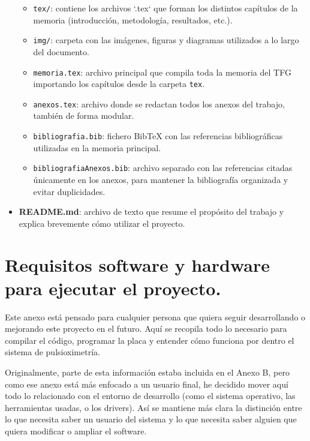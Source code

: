 \begin{itemize}
    \begin{itemize}
        \item \texttt{tex/}: contiene los archivos `.tex` que forman los distintos capítulos de la memoria (introducción, metodología, resultados, etc.). 
        \item \texttt{img/}: carpeta con las imágenes, figuras y diagramas utilizados a lo largo del documento.
        \item \texttt{memoria.tex}: archivo principal que compila toda la memoria del TFG importando los capítulos desde la carpeta \texttt{tex}.
        \item \texttt{anexos.tex}: archivo donde se redactan todos los anexos del trabajo, también de forma modular.
        \item \texttt{bibliografia.bib}: fichero BibTeX con las referencias bibliográficas utilizadas en la memoria principal.
        \item \texttt{bibliografiaAnexos.bib}: archivo separado con las referencias citadas únicamente en los anexos, para mantener la bibliografía organizada y evitar duplicidades.
    \end{itemize}


    \item \textbf{README.md}: archivo de texto que resume el propósito del trabajo y explica brevemente cómo utilizar el proyecto.

    
    
\end{itemize}

\section{Requisitos software y hardware para ejecutar el proyecto.}

Este anexo está pensado para cualquier persona que quiera seguir desarrollando o mejorando este proyecto en el futuro.
Aquí se recopila todo lo necesario para compilar el código, programar la placa y entender cómo funciona por dentro el sistema de pulsioximetría.

Originalmente, parte de esta información estaba incluida en el Anexo B, pero como ese anexo está más enfocado a un usuario final, he decidido mover aquí todo lo relacionado con el entorno de desarrollo (como el sistema operativo, las herramientas usadas, o los drivers).
Así se mantiene más clara la distinción entre lo que necesita saber un usuario del sistema y lo que necesita saber alguien que quiera modificar o ampliar el software.

